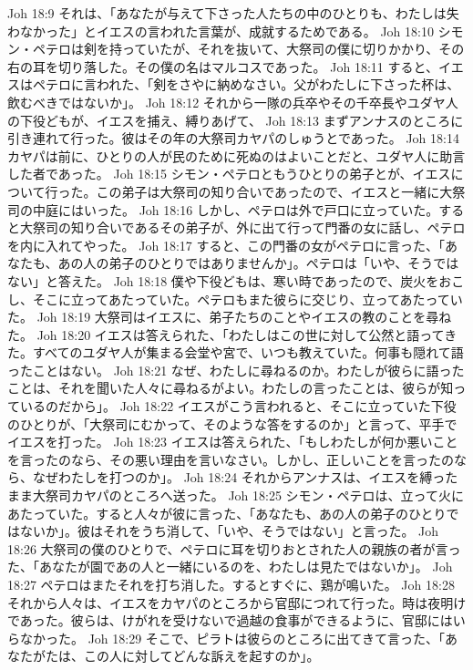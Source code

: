 Joh 18:9  それは、「あなたが与えて下さった人たちの中のひとりも、わたしは失わなかった」とイエスの言われた言葉が、成就するためである。
Joh 18:10  シモン・ペテロは剣を持っていたが、それを抜いて、大祭司の僕に切りかかり、その右の耳を切り落した。その僕の名はマルコスであった。
Joh 18:11  すると、イエスはペテロに言われた、「剣をさやに納めなさい。父がわたしに下さった杯は、飲むべきではないか」。
Joh 18:12  それから一隊の兵卒やその千卒長やユダヤ人の下役どもが、イエスを捕え、縛りあげて、
Joh 18:13  まずアンナスのところに引き連れて行った。彼はその年の大祭司カヤパのしゅうとであった。
Joh 18:14  カヤパは前に、ひとりの人が民のために死ぬのはよいことだと、ユダヤ人に助言した者であった。
Joh 18:15  シモン・ペテロともうひとりの弟子とが、イエスについて行った。この弟子は大祭司の知り合いであったので、イエスと一緒に大祭司の中庭にはいった。
Joh 18:16  しかし、ペテロは外で戸口に立っていた。すると大祭司の知り合いであるその弟子が、外に出て行って門番の女に話し、ペテロを内に入れてやった。
Joh 18:17  すると、この門番の女がペテロに言った、「あなたも、あの人の弟子のひとりではありませんか」。ペテロは「いや、そうではない」と答えた。
Joh 18:18  僕や下役どもは、寒い時であったので、炭火をおこし、そこに立ってあたっていた。ペテロもまた彼らに交じり、立ってあたっていた。
Joh 18:19  大祭司はイエスに、弟子たちのことやイエスの教のことを尋ねた。
Joh 18:20  イエスは答えられた、「わたしはこの世に対して公然と語ってきた。すべてのユダヤ人が集まる会堂や宮で、いつも教えていた。何事も隠れて語ったことはない。
Joh 18:21  なぜ、わたしに尋ねるのか。わたしが彼らに語ったことは、それを聞いた人々に尋ねるがよい。わたしの言ったことは、彼らが知っているのだから」。
Joh 18:22  イエスがこう言われると、そこに立っていた下役のひとりが、「大祭司にむかって、そのような答をするのか」と言って、平手でイエスを打った。
Joh 18:23  イエスは答えられた、「もしわたしが何か悪いことを言ったのなら、その悪い理由を言いなさい。しかし、正しいことを言ったのなら、なぜわたしを打つのか」。
Joh 18:24  それからアンナスは、イエスを縛ったまま大祭司カヤパのところへ送った。
Joh 18:25  シモン・ペテロは、立って火にあたっていた。すると人々が彼に言った、「あなたも、あの人の弟子のひとりではないか」。彼はそれをうち消して、「いや、そうではない」と言った。
Joh 18:26  大祭司の僕のひとりで、ペテロに耳を切りおとされた人の親族の者が言った、「あなたが園であの人と一緒にいるのを、わたしは見たではないか」。
Joh 18:27  ペテロはまたそれを打ち消した。するとすぐに、鶏が鳴いた。
Joh 18:28  それから人々は、イエスをカヤパのところから官邸につれて行った。時は夜明けであった。彼らは、けがれを受けないで過越の食事ができるように、官邸にはいらなかった。
Joh 18:29  そこで、ピラトは彼らのところに出てきて言った、「あなたがたは、この人に対してどんな訴えを起すのか」。
